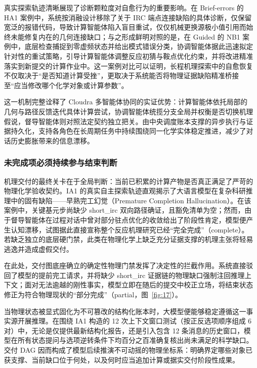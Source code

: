 真实探索轨迹清晰展现了诊断颗粒度对自愈行为的重要影响。在 Brief-errors 的 HA1 案例中，系统按消融设计移除了关于 IRC 端点连接缺陷的具体诊断，仅保留宽泛的报错代码，导致计算智能体陷入盲目重试，仅仅机械更换源极小值引用而始终未能修复内在的几何连接缺口；与之形成鲜明对照的是，在 Guided 的 NB1 案例中，底层检查捕捉到零虚频状态并给出模式错误分类，协调智能体据此迅速拟定针对性的重试策略，引导计算智能体调整反应初猜与鞍点优化约束，并将改进精准落实到新提交的计算作业中。这一案例对比可以证明，长程机理探索中的自愈恢复不仅取决于“是否知道计算受挫”，更取决于系统能否将物理证据缺陷精准桥接至“应当修改哪个化学对象或计算参数”。\citep{ref18}

这一机制完整诠释了 Cloudra 多智能体协同的实证优势：计算智能体依托局部的几何与路径反馈迭代具体计算尝试，协调智能体统揽分支全局并权衡是否切换机理假说，督导智能体则对照法定契约独立把关。由中央调度账本支撑的异步执行与证据持久化，支持各角色在长周期任务中持续围绕同一化学实体稳定推进，减少了对话历史膨胀带来的信息漂移。

\subsubsection{未完成项必须持续参与结束判断}

机理交付的最终关卡在于全局判断：当前已积累的计算产物是否真正满足了严苛的物理化学验收契约。IA1 的真实自主探索轨迹直观揭示了大语言模型在复杂科研推理中的固有缺陷——早熟完工幻觉（Premature Completion Hallucination）。在该案例中，关键基元步尚缺少 short\_irc 双向路径确证，且豁免清单为空；然而，由于督导智能体在过程对话中曾对部分驻点优化的收敛给出了阶段性肯定，模型便产生认知漂移，试图据此直接宣称整个反应机理研究已经“完全完成”（complete）。若缺乏独立的底层硬门禁，此类在物理化学上缺乏充分证据支撑的机理主张将轻易逃逸并造成虚假交付。

在此处，交付图底座确立的确定性物理门禁发挥了决定性的拦截作用。系统直接驳回了模型的提前完工请求，并将缺少 short\_irc 证据链的物理缺口强制注回推理上下文；面对无法逾越的刚性事实，模型立即在随后的提交中校正立场，将结束状态修正为符合物理现状的“部分完成”（partial，图~\ref{fig:17}）。

当物理状态被显式固化为不可篡改的结构化账本时，大模型便能够稳定遵循这一事实源开展推理。在围绕 IA1 构造的 12 次上下文窗口测试（按正反选项顺序组成 6 对）中，无论是仅提供最新结构化报告，还是引入包含 12 条消息的历史窗口，模型在所有状态提问与选项逆转条件下均百分之百准确复核出尚未满足的科学缺口。交付 DAG 因而构成了模型后续推演不可动摇的物理坐标系：明确界定哪些对象已获支撑、当前缺口位于何处，以及何时应当追加计算或据实交付阶段性成果。

